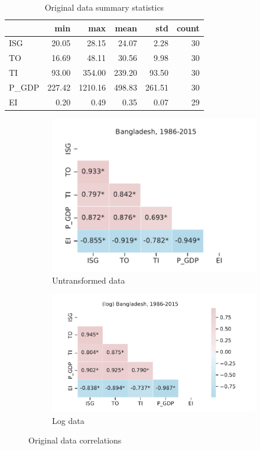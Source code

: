 \documentclass[11pt,a4paper]{article}
\begin{document}
\begin{table}[tbp]
\centering
\begin{tabular}{lrrrrr}
\toprule
{} &    min &     max &   mean &    std &  count \\
\midrule
ISG   &  20.05 &   28.15 &  24.07 &   2.28 &     30 \\
TO    &  16.69 &   48.11 &  30.56 &   9.98 &     30 \\
TI    &  93.00 &  354.00 & 239.20 &  93.50 &     30 \\
P\_GDP & 227.42 & 1210.16 & 498.83 & 261.51 &     30 \\
EI    &   0.20 &    0.49 &   0.35 &   0.07 &     29 \\
\bottomrule
\end{tabular}
\caption{Original data summary statistics}
\label{tab:original_summary_stats}
\end{table}


\begin{figure}[tbp]
\centering
\begin{subfigure}{0.43\textwidth}
\includegraphics[width=\textwidth]{./plots/BGD_201805_correlations.pdf}
\caption{Untransformed data}
\end{subfigure}%
\begin{subfigure}{0.57\textwidth}
\includegraphics[width=\textwidth]{./plots/BGD_201805_correlations_log.pdf}
\caption{Log data}
\end{subfigure}
\caption{Original data correlations}
\label{fig:original_summary_corr}
\end{figure}
\end{document}
